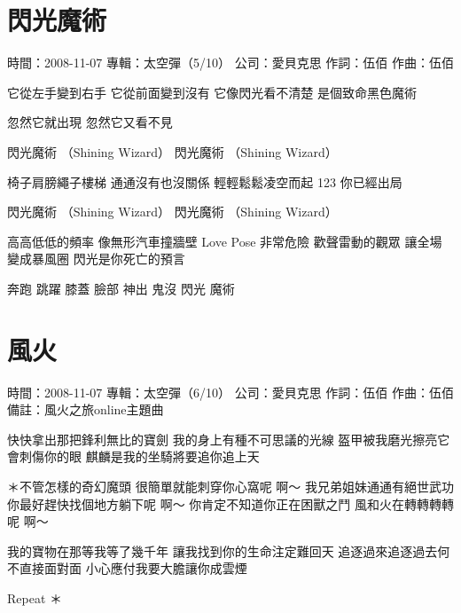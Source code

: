 \documentclass[UTF8,a4paper,oneside,twocolumn,12pt]{ctexbook}
\newcommand{\infopair}[2]{\textbullet #1：#2}
\newcommand{\zc}[1][伍佰]{\infopair{作詞}{#1}}
\newcommand{\zq}[1][伍佰]{\infopair{作曲}{#1}}
\newcommand{\zj}[1]{\infopair{專輯}{#1}}
\newcommand{\sj}[1]{\infopair{時間}{#1}}
\newcommand{\bz}[1]{\infopair{備註}{#1}}
\newcommand{\gs}[1]{\infopair{公司}{#1}}
\newenvironment{info}{\begin{flushleft}\kaishu
	}
	{\end{flushleft}\normalsize\yahei\par}
\newenvironment{lyric}{
	}
{}
\begin{document}
\section{閃光魔術}
\begin{info}
	\sj{2008-11-07}
	\zj{太空彈（5/10）}
	\gs{愛貝克思}
	\zc
	\zq
\end{info}
\begin{lyric}
	它從左手變到右手
	它從前面變到沒有
	它像閃光看不清楚
	是個致命黑色魔術

	忽然它就出現
	忽然它又看不見

	閃光魔術 （Shining Wizard）
	閃光魔術 （Shining Wizard）

	椅子肩膀繩子樓梯
	通通沒有也沒關係
	輕輕鬆鬆凌空而起
	123 你已經出局

	閃光魔術 （Shining Wizard）
	閃光魔術 （Shining Wizard）

	高高低低的頻率 像無形汽車撞牆壁
	Love Pose 非常危險
	歡聲雷動的觀眾 讓全場變成暴風圈
	閃光是你死亡的預言

	奔跑 跳躍 膝蓋 臉部
	神出 鬼沒 閃光 魔術
\end{lyric}

\section{風火}
\begin{info}
	\sj{2008-11-07}
	\zj{太空彈（6/10）}
	\gs{愛貝克思}
	\zc
	\zq
	\bz{風火之旅online主題曲}
\end{info}
\begin{lyric}
	快快拿出那把鋒利無比的寶劍
	我的身上有種不可思議的光線
	盔甲被我磨光擦亮它會刺傷你的眼
	麒麟是我的坐騎將要追你追上天

	＊不管怎樣的奇幻魔頭
	很簡單就能刺穿你心窩呢 啊～
	我兄弟姐妹通通有絕世武功
	你最好趕快找個地方躺下呢 啊～
	你肯定不知道你正在困獸之鬥
	風和火在轉轉轉轉呢 啊～

	我的寶物在那等我等了幾千年
	讓我找到你的生命注定難回天
	追逐過來追逐過去何不直接面對面
	小心應付我要大膽讓你成雲煙

	Repeat ＊
\end{lyric}
\end{document}
